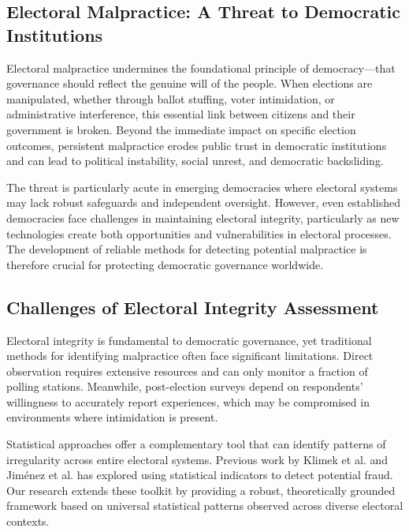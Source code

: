 \subsection{Electoral Malpractice: A Threat to Democratic Institutions}
Electoral malpractice undermines the foundational principle of democracy—that governance should reflect the genuine will of the people. When elections are manipulated, whether through ballot stuffing, voter intimidation, or administrative interference, this essential link between citizens and their government is broken. Beyond the immediate impact on specific election outcomes, persistent malpractice erodes public trust in democratic institutions and can lead to political instability, social unrest, and democratic backsliding.

The threat is particularly acute in emerging democracies where electoral systems may lack robust safeguards and independent oversight. However, even established democracies face challenges in maintaining electoral integrity, particularly as new technologies create both opportunities and vulnerabilities in electoral processes. The development of reliable methods for detecting potential malpractice is therefore crucial for protecting democratic governance worldwide.
\subsection{Challenges of Electoral Integrity Assessment}
Electoral integrity is fundamental to democratic governance, yet traditional methods for identifying malpractice often face significant limitations. Direct observation requires extensive resources and can only monitor a fraction of polling stations. Meanwhile, post-election surveys depend on respondents' willingness to accurately report experiences, which may be compromised in environments where intimidation is present.

Statistical approaches offer a complementary tool that can identify patterns of irregularity across entire electoral systems. Previous work by Klimek et al. \cite{klimek2012statistical} and Jiménez et al. \cite{jimenez2017testing} has explored using statistical indicators to detect potential fraud. Our research extends these toolkit by providing a robust, theoretically grounded framework based on universal statistical patterns observed across diverse electoral contexts.
